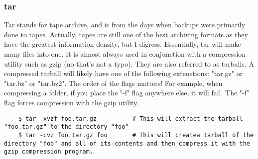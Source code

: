\subsubsection{tar} \mdseries
Tar stands for tape archive, and is from the days when backups were primarily done to tapes.  Actually, tapes are still one of the best archiving formats as they have the greatest information density, but I digress.  Essentially, tar will make many files into one.  It is almost always used in conjunction with a compression utility such as gzip (no that's not a typo).  They are also referred to as tarballs.  A compressed tarball will likely have one of the following extenstions: "tar.gz" or "tar.bz" or "tar.bz2".  The order of the flags matters!  For example, when compressing a folder, if you place the "-f" flag anywhere else, it will fail.  The "-f" flag forces compression with the gzip utility.

	\begin{lstlisting}
	$ tar -xvzf foo.tar.gz			# This will extract the tarball "foo.tar.gz" to the directory "foo"
	$ tar -cvz foo.tar.gz foo		# This will createa tarball of the directory "foo" and all of its contents and then compress it with the gzip compression program.
	\end{lstlisting}



